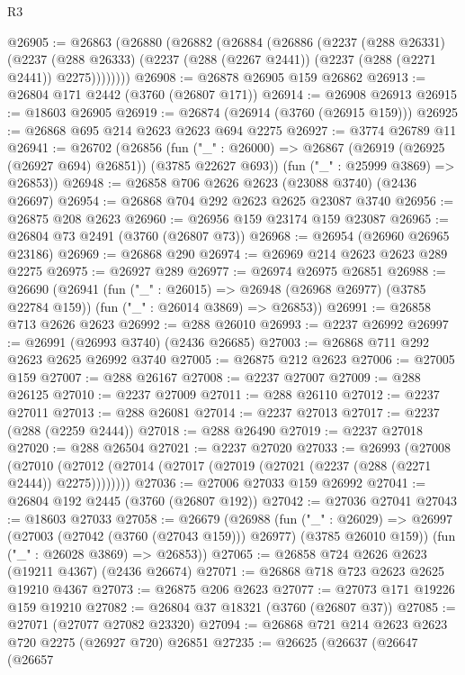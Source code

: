 \begin{lexlean}{R3}
\begin{coremodule}
@26905 := @26863
    (@26880
      (@26882
        (@26884
          (@26886
            (@2237
              (@288 @26331)
              (@2237
                (@288 @26333)
                (@2237 (@288 (@2267 @2441)) (@2237 (@288 (@2271 @2441)) @2275))))))))
@26908 := @26878 @26905 @159 @26862
@26913 := @26804 @171 @2442 (@3760 (@26807 @171))
@26914 := @26908 @26913
@26915 := @18603 @26905
@26919 := @26874 (@26914 (@3760 (@26915 @159)))
@26925 := @26868 @695 @214 @2623 @2623 @694 @2275
@26927 := @3774 @26789 @11
@26941 := @26702
    (@26856
      (fun ("_" : @26000) => @26867 (@26919 (@26925 (@26927 @694) @26851)) (@3785 @22627 @693))
      (fun ("_" : @25999 @3869) => @26853))
@26948 := @26858 @706 @2626 @2623 (@23088 @3740) (@2436 @26697)
@26954 := @26868 @704 @292 @2623 @2625 @23087 @3740
@26956 := @26875 @208 @2623
@26960 := @26956 @159 @23174 @159 @23087
@26965 := @26804 @73 @2491 (@3760 (@26807 @73))
@26968 := @26954 (@26960 @26965 @23186)
@26969 := @26868 @290
@26974 := @26969 @214 @2623 @2623 @289 @2275
@26975 := @26927 @289
@26977 := @26974 @26975 @26851
@26988 := @26690
    (@26941
      (fun ("_" : @26015) => @26948 (@26968 @26977) (@3785 @22784 @159))
      (fun ("_" : @26014 @3869) => @26853))
@26991 := @26858 @713 @2626 @2623
@26992 := @288 @26010
@26993 := @2237 @26992
@26997 := @26991 (@26993 @3740) (@2436 @26685)
@27003 := @26868 @711 @292 @2623 @2625 @26992 @3740
@27005 := @26875 @212 @2623
@27006 := @27005 @159
@27007 := @288 @26167
@27008 := @2237 @27007
@27009 := @288 @26125
@27010 := @2237 @27009
@27011 := @288 @26110
@27012 := @2237 @27011
@27013 := @288 @26081
@27014 := @2237 @27013
@27017 := @2237 (@288 (@2259 @2444))
@27018 := @288 @26490
@27019 := @2237 @27018
@27020 := @288 @26504
@27021 := @2237 @27020
@27033 := @26993
    (@27008
      (@27010 (@27012 (@27014 (@27017 (@27019 (@27021 (@2237 (@288 (@2271 @2444)) @2275))))))))
@27036 := @27006 @27033 @159 @26992
@27041 := @26804 @192 @2445 (@3760 (@26807 @192))
@27042 := @27036 @27041
@27043 := @18603 @27033
@27058 := @26679
    (@26988
      (fun ("_" : @26029) =>
      @26997 (@27003 (@27042 (@3760 (@27043 @159))) @26977) (@3785 @26010 @159))
      (fun ("_" : @26028 @3869) => @26853))
@27065 := @26858 @724 @2626 @2623 (@19211 @4367) (@2436 @26674)
@27071 := @26868 @718 @723 @2623 @2625 @19210 @4367
@27073 := @26875 @206 @2623
@27077 := @27073 @171 @19226 @159 @19210
@27082 := @26804 @37 @18321 (@3760 (@26807 @37))
@27085 := @27071 (@27077 @27082 @23320)
@27094 := @26868 @721 @214 @2623 @2623 @720 @2275 (@26927 @720) @26851
@27235 := @26625
    (@26637
      (@26647
        (@26657

\end{coremodule}
\end{lexlean}

